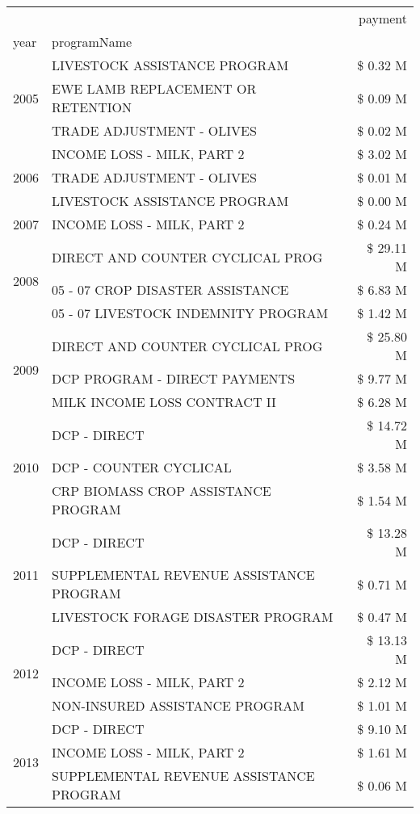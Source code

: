 \begin{tabular}{llr}
\toprule
 &  & payment \\
year & programName &  \\
\midrule
\multirow[t]{3}{*}{2005} & LIVESTOCK ASSISTANCE PROGRAM & \$ 0.32 M \\
 & EWE LAMB REPLACEMENT OR RETENTION & \$ 0.09 M \\
 & TRADE ADJUSTMENT - OLIVES & \$ 0.02 M \\
\cline{1-3}
\multirow[t]{3}{*}{2006} & INCOME LOSS - MILK, PART 2 & \$ 3.02 M \\
 & TRADE ADJUSTMENT - OLIVES & \$ 0.01 M \\
 & LIVESTOCK ASSISTANCE PROGRAM & \$ 0.00 M \\
\cline{1-3}
2007 & INCOME LOSS - MILK, PART 2 & \$ 0.24 M \\
\cline{1-3}
\multirow[t]{3}{*}{2008} & DIRECT AND COUNTER CYCLICAL PROG & \$ 29.11 M \\
 & 05 - 07 CROP DISASTER ASSISTANCE & \$ 6.83 M \\
 & 05 - 07 LIVESTOCK INDEMNITY PROGRAM & \$ 1.42 M \\
\cline{1-3}
\multirow[t]{3}{*}{2009} & DIRECT AND COUNTER CYCLICAL PROG & \$ 25.80 M \\
 & DCP PROGRAM - DIRECT PAYMENTS & \$ 9.77 M \\
 & MILK INCOME LOSS CONTRACT II & \$ 6.28 M \\
\cline{1-3}
\multirow[t]{3}{*}{2010} & DCP - DIRECT & \$ 14.72 M \\
 & DCP - COUNTER CYCLICAL & \$ 3.58 M \\
 & CRP BIOMASS CROP ASSISTANCE PROGRAM & \$ 1.54 M \\
\cline{1-3}
\multirow[t]{3}{*}{2011} & DCP - DIRECT & \$ 13.28 M \\
 & SUPPLEMENTAL REVENUE ASSISTANCE PROGRAM & \$ 0.71 M \\
 & LIVESTOCK FORAGE DISASTER PROGRAM & \$ 0.47 M \\
\cline{1-3}
\multirow[t]{3}{*}{2012} & DCP - DIRECT & \$ 13.13 M \\
 & INCOME LOSS - MILK, PART 2 & \$ 2.12 M \\
 & NON-INSURED ASSISTANCE PROGRAM & \$ 1.01 M \\
\cline{1-3}
\multirow[t]{3}{*}{2013} & DCP - DIRECT & \$ 9.10 M \\
 & INCOME LOSS - MILK, PART 2 & \$ 1.61 M \\
 & SUPPLEMENTAL REVENUE ASSISTANCE PROGRAM & \$ 0.06 M \\

\end{tabular}
